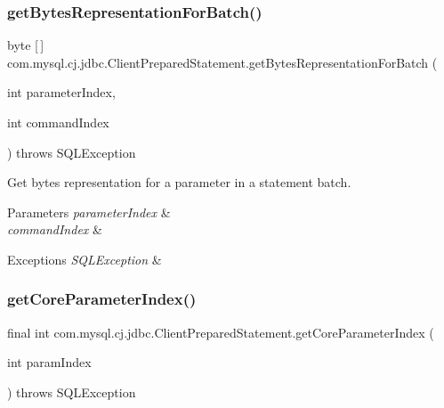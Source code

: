 \subsubsection{\texorpdfstring{get\+Bytes\+Representation\+For\+Batch()}{getBytesRepresentationForBatch()}}
{\footnotesize\ttfamily byte \mbox{[}$\,$\mbox{]} com.\+mysql.\+cj.\+jdbc.\+Client\+Prepared\+Statement.\+get\+Bytes\+Representation\+For\+Batch (\begin{DoxyParamCaption}\item[{int}]{parameter\+Index,  }\item[{int}]{command\+Index }\end{DoxyParamCaption}) throws S\+Q\+L\+Exception\hspace{0.3cm}{\ttfamily [protected]}}

Get bytes representation for a parameter in a statement batch.


\begin{DoxyParams}{Parameters}
{\em parameter\+Index} & \\
\hline
{\em command\+Index} & \\
\hline
\end{DoxyParams}

\begin{DoxyExceptions}{Exceptions}
{\em S\+Q\+L\+Exception} & \\
\hline
\end{DoxyExceptions}
\mbox{\label{classcom_1_1mysql_1_1cj_1_1jdbc_1_1_client_prepared_statement_a3a9ad28da0a88ee861d1484c872ea206}} 
\subsubsection{\texorpdfstring{get\+Core\+Parameter\+Index()}{getCoreParameterIndex()}}
{\footnotesize\ttfamily final int com.\+mysql.\+cj.\+jdbc.\+Client\+Prepared\+Statement.\+get\+Core\+Parameter\+Index (\begin{DoxyParamCaption}\item[{int}]{param\+Index }\end{DoxyParamCaption}) throws S\+Q\+L\+Exception\hspace{0.3cm}{\ttfamily [protected]}}

